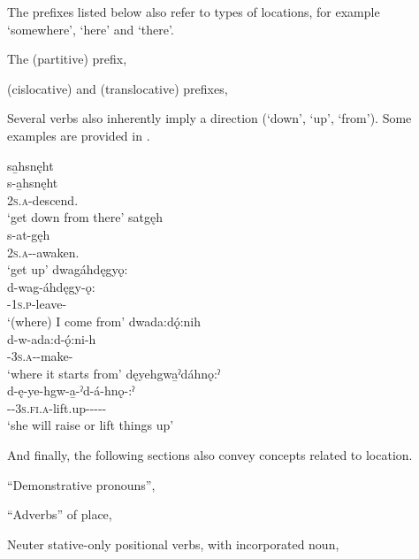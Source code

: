 The prefixes listed below also refer to types of locations, for example  {\partitive} ‘somewhere’,  {\cislocative} ‘here’ and  {\translocative} ‘there’.


\begin{CayugaRelated}
\item{}The  (partitive) prefix, 

\item{} (cislocative) and  (translocative) prefixes, 
\end{CayugaRelated}

Several verbs also inherently imply a direction (‘down’, ‘up’, ‘from’). Some examples are provided in .

\ea\label{ex:preposex3}
\ea sa̱hsnęht\\
\gll s-a̱hsnęht\\
 \textsc{2s.a}-descend.{\noaspect}\\
\glt `get down from there'
\ex satgęh\\
\gll s-at-gęh\\
 \textsc{2s.a}-{\semireflexive}-awaken.{\noaspect}\\
\glt `get up'
\ex dwagáhdęgyǫ:\\
\gll d-wag-áhdęgy-ǫ:\\
 {\cislocative}-\textsc{1s.p}-leave-{\stative}\\
\glt `(where) I come from'
\ex dwada:dǫ́:nih\\
\gll d-w-ada:d-ǫ́:ni-h\\
 {\cislocative}-\textsc{3s.a}-{}-make-{\habitual}\\
\glt `where it starts from'
\ex dęyehgwa̱ˀdáhnǫ:ˀ\\
\gll d-ę-ye-hgw-a̱-ˀd-á-hnǫ-:ˀ\\
 \textsc{\dualic-\future-3s.fi.a}-lift.up-\textsc{\JoinerA-\causative-\JoinerA-\distributive-\punctual}\\
\glt `she will raise or lift things up'
\z
\z

And finally, the following sections also convey concepts related to location.

\begin{CayugaRelated}
\item “Demonstrative pronouns”, 

\item “Adverbs” of place, 

\item Neuter stative-only positional verbs, with incorporated noun, 
\end{CayugaRelated}
